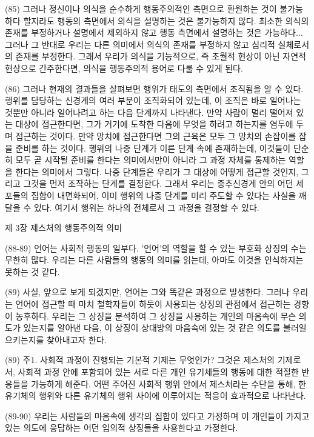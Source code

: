 \documentclass[11pt, a4paper]{article}
\begin{document}
(85) 그러나 정신이나 의식을 순수하게 행동주의적인 측면으로 환원하는 것이 불가능하다 할지라도 행동의 측면에서 의식을 설명하는 것은 불가능하지 않다. 최소한 의식의 존재를 부정하거나 설명에서 제외하지 않고 행동 측면에서 설명하는 것은 가능하다... 그러나 그 반대로 우리는 다른 의미에서 의식의 존재를 부정하지 않고 심리적 실체로서의 존재를 부정한다. 그래서 우리가 의식을 기능적으로, 즉 초월적 현상이 아닌 자연적 현상으로 간주한다면, 의식을 행동주의적 용어로 다룰 수 있게 된다. 

(86) 그러나 현재의 결과들을 살펴보면 행위가 태도의 측면에서 조직됨을 알 수 있다. 행위를 담당하는 신경계의 여러 부분이 조직화되어 있는데, 이 조직은 바로 일어나는 것뿐만 아니라 일어나려고 하는 다음 단계까지 나타낸다. 만약 사람이 멀리 떨어져 있는 대상에 접근한다면, 그가 거기에 도착한 다음에 무엇을 하려고 하는지를 염두에 두며 접근하는 것이다. 만약 망치에 접근한다면 그의 근육은 모두 그 망치의 손잡이를 잡을 준비를 하는 것이다. 행위의 나중 단계가 이른 단계 속에 존재하는데, 이것들이 단순히 모두 곧 시작될 준비를 한다는 의미에서만이 아니라 그 과정 자체를 통제하는 역할을 한다는 의미에서 그렇다. 나중 단계들은 우리가 그 대상에 어떻게 접근할 것인지, 그리고 그것을 먼저 조작하는 단계를 결정한다. 그래서 우리는 중추신경계 안의 어던 세포들의 집합이 내면화되어, 이미 행위의 나중 단계를 미리 주도할 수 있다는 사실을 깨달을 수 있다. 여기서 행위는 하나의 전체로서 그 과정을 결정할 수 있다. 

제 3장 제스처의 행동주의적 의미

(88-89) 언어는 사회적 행동의 일부다. '언어'의 역할을 할 수 있는 부호화 상징의 수는 무한히 많다. 우리는 다른 사람들의 행동의 의미를 읽는데, 아마도 이것을 인식하지는 못하는 것 같다. 

(89) 사실, 앞으로 보게 되겠지만, 언어는 그와 똑같은 과정으로 발생한다. 그러나 우리는 언어에 접근할 때 마치 철학자들이 하듯이 사용되는 상징의 관점에서 접근하는 경향이 농후하다. 우리는 그 상징을 분석하여 그 상징을 사용하는 개인의 마음속에 무슨 의도가 있는지를 알아낸 다음, 이 상징이 상대방의 마음속에 있는 것 같은 의도를 불러일으키는지를 찾아내고자 한다.

(89) 주1. 사회적 과정이 진행되는 기본적 기제는 무엇인가? 그것은 제스처의 기제로서, 사회적 과정 안에 포함되어 있는 서로 다른 개인 유기체들의 행동에 대한 적절한 반응들을 가능하게 해준다. 어떤 주어진 사회적 행위 안에서 제스처라는 수단을 통해, 한 유기체의 행위와 다른 유기체의 행위 사이에 이루어지는 적응이 효과적으로 나타난다.  

(89-90) 우리는 사람들의 마음속에 생각의 집합이 있다고 가정하며 이 개인들이 가지고 있는 의도에 응답하는 어던 임의적 상징들을 사용한다고 가정한다. 
\end{document}
